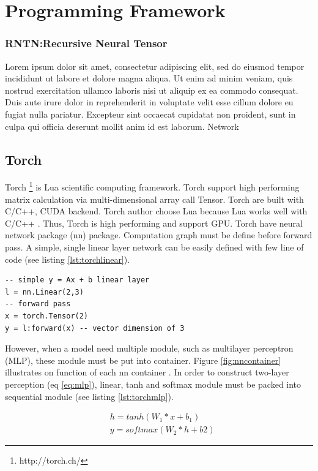 \section{Programming Framework}
\subsubsection{RNTN:Recursive Neural Tensor}
Lorem ipsum dolor sit amet, consectetur adipiscing elit, sed do eiusmod tempor incididunt ut labore et dolore magna aliqua. Ut enim ad minim veniam, quis nostrud exercitation ullamco laboris nisi ut aliquip ex ea commodo consequat. Duis aute irure dolor in reprehenderit in voluptate velit esse cillum dolore eu fugiat nulla pariatur. Excepteur sint occaecat cupidatat non proident, sunt in culpa qui officia deserunt mollit anim id est laborum. Network
\subsection{Torch}
Torch \footnote{http://torch.ch/} is Lua scientific computing framework. Torch support high performing matrix calculation via multi-dimensional array call Tensor. Torch are built with C/C++, CUDA backend. Torch author choose Lua because Lua works well with C/C++ \cite{collobert2011torch7}.  Thus, Torch is high performing and support GPU. Torch have neural network package (nn) package. Computation graph must be define before forward pass.
A simple, single linear layer network can be easily defined with few line of code (see listing \ref{lst:torchlinear}).

\begin{lstlisting}[caption={Simple linear layer in Torch},label={lst:torchlinear}, language={[5.1]Lua}]
-- simple y = Ax + b linear layer
l = nn.Linear(2,3)
-- forward pass
x = torch.Tensor(2)
y = l:forward(x) -- vector dimension of 3
\end{lstlisting}

However, when a model need multiple module, such as multilayer perceptron (MLP), these module must be put into container. Figure \ref{fig:nncontainer} illustrates on function of each nn container . In order to construct two-layer perception (eq \ref{eq:mlp}), linear, tanh and softmax module must be packed into sequential module (see listing \ref{lst:torchmlp}).

\begin{equation}
\label{eq:mlp}
\begin{aligned}
&h = tanh(W_1*x + b_1) \\
&y = softmax(W_2*h + b2)
\end{aligned}
\end{equation}


